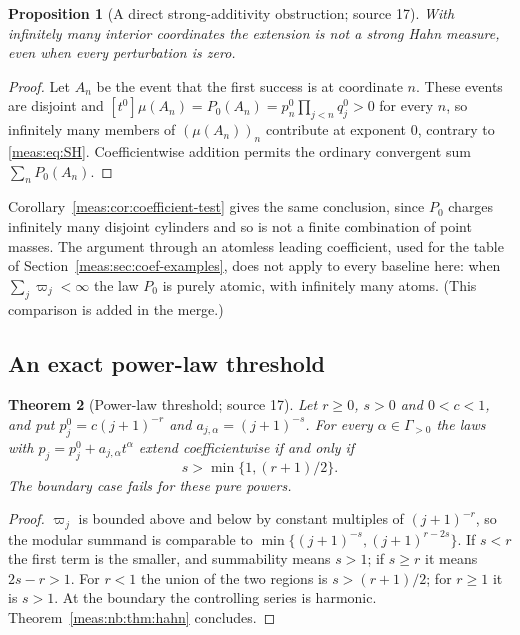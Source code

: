 \documentclass[11pt]{article}
\numberwithin{equation}{section}
\newtheorem{theorem}{Theorem}[section]
\newtheorem{proposition}[theorem]{Proposition}
\theoremstyle{definition}
\theoremstyle{remark}
\newcommand{\coef}[2]{[t^{#1}]#2}
\begin{document}
\begin{proposition}[A direct strong-additivity obstruction; source 17]
\label{meas:nb:prop:notstrong}
With infinitely many interior coordinates the extension is not a strong Hahn
measure, even when every perturbation is zero.
\end{proposition}
\begin{proof}
Let $A_n$ be the event that the first success is at coordinate $n$. These events are
disjoint and $\coef0{\mu(A_n)}=P_0(A_n)=p_n^0\prod_{j<n}q_j^0>0$ for every $n$, so
infinitely many members of $(\mu(A_n))_n$ contribute at exponent $0$, contrary to
\eqref{meas:eq:SH}. Coefficientwise addition permits the ordinary convergent sum
$\sum_nP_0(A_n)$.
\end{proof}

Corollary~\ref{meas:cor:coefficient-test} gives the same conclusion, since $P_0$
charges infinitely many disjoint cylinders and so is not a finite combination of
point masses. The argument through an atomless leading coefficient, used for the
table of Section~\ref{meas:sec:coef-examples}, does not apply to every baseline here:
when $\sum_j\varpi_j<\infty$ the law $P_0$ is purely atomic, with infinitely many
atoms. (This comparison is added in the merge.)

\subsection{An exact power-law threshold}

\begin{theorem}[Power-law threshold; source 17]\label{meas:nb:thm:power}
Let $r\ge0$, $s>0$ and $0<c<1$, and put $p_j^0=c(j+1)^{-r}$ and
$a_{j,\alpha}=(j+1)^{-s}$. For every $\alpha\in\Gamma_{>0}$ the laws with
$p_j=p_j^0+a_{j,\alpha}t^\alpha$ extend coefficientwise if and only if
\begin{equation}\label{meas:nb:eq:power-threshold}
 s>\min\{1,(r+1)/2\}.
\end{equation}
The boundary case fails for these pure powers.
\end{theorem}
\begin{proof}
$\varpi_j$ is bounded above and below by constant multiples of $(j+1)^{-r}$, so the
modular summand is comparable to $\min\{(j+1)^{-s},(j+1)^{r-2s}\}$. If $s<r$ the
first term is the smaller, and summability means $s>1$; if $s\ge r$ it means
$2s-r>1$. For $r<1$ the union of the two regions is $s>(r+1)/2$; for $r\ge1$ it is
$s>1$. At the boundary the controlling series is harmonic.
Theorem~\ref{meas:nb:thm:hahn} concludes.
\end{proof}
\end{document}
